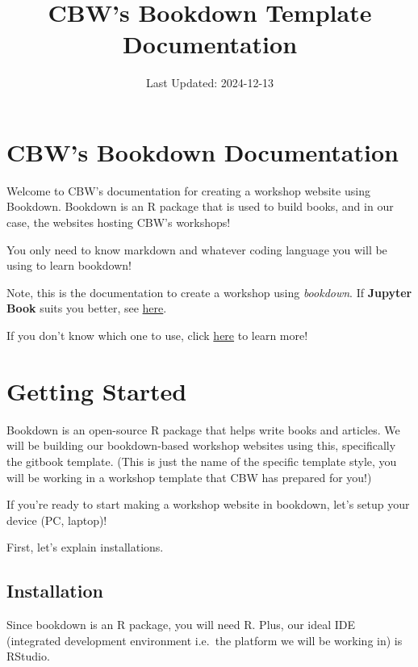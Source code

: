 \documentclass[
]{book}
\title{CBW's Bookdown Template Documentation}
\author{}
\date{\vspace{-2.5em}Last Updated: 2024-12-13}
\theoremstyle{definition}
\theoremstyle{definition}
\theoremstyle{definition}
\theoremstyle{definition}
\theoremstyle{remark}
\begin{document}
\maketitle

{
\setcounter{tocdepth}{1}
\tableofcontents
}
\chapter{CBW's Bookdown Documentation}\label{cbws-bookdown-documentation}

Welcome to CBW's documentation for creating a workshop website using Bookdown. Bookdown is an R package that is used to build books, and in our case, the websites hosting CBW's workshops!

You only need to know markdown and whatever coding language you will be using to learn bookdown!

Note, this is the documentation to create a workshop using \emph{bookdown}. If \textbf{Jupyter Book} suits you better, see \href{https://cbw-dev.github.io/jupyterbook-docs/}{here}.

If you don't know which one to use, click \href{}{here} to learn more!

\chapter{Getting Started}\label{get-started}

Bookdown is an open-source R package that helps write books and articles. We will be building our bookdown-based workshop websites using this, specifically the gitbook template. (This is just the name of the specific template style, you will be working in a workshop template that CBW has prepared for you!)

If you're ready to start making a workshop website in bookdown, let's setup your device (PC, laptop)!

First, let's explain installations.

\section{Installation}\label{installation}

Since bookdown is an R package, you will need R. Plus, our ideal IDE (integrated development environment i.e.~the platform we will be working in) is RStudio.
\end{document}

